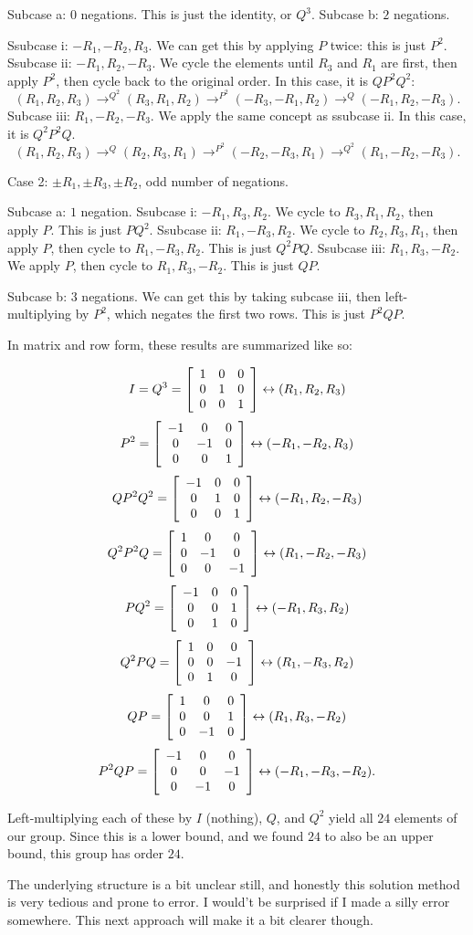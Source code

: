 \documentclass[../key.tex]{subfiles}
\begin{document}
Subcase a: $0$ negations. This is just the identity, or $Q^3$.
Subcase b: $2$ negations.

Ssubcase i: $-R_1, -R_2, R_3$.
We can get this by applying $P$ twice: this is just $P^2$.
Ssubcase ii: $-R_1, R_2, -R_3$.
We cycle the elements until $R_3$ and $R_1$ are first, then apply $P^2$, then cycle back to the original order. In this case, it is $QP^2Q^2$:
$$(R_1,R_2,R_3)\rightarrow^{Q^2} (R_3,R_1,R_2)\rightarrow^{P^2} (-R_3,-R_1,R_2)\rightarrow^{Q} (-R_1,R_2,-R_3).$$
Subcase iii: $R_1, -R_2, -R_3$.
We apply the same concept as ssubcase ii. In this case, it is $Q^2P^2Q$.
$$(R_1,R_2,R_3)\rightarrow^{Q} (R_2,R_3,R_1) \rightarrow^{P^2} (-R_2,-R_3,R_1) \rightarrow^{Q^2} (R_1, -R_2, -R_3).$$

Case 2: $\pm R_1, \pm R_3, \pm R_2$, odd number of negations.

Subcase a: $1$ negation.
Ssubcase i: $-R_1, R_3, R_2$.
We cycle to $R_3, R_1, R_2$, then apply $P$. This is just $PQ^2$.
Ssubcase ii: $R_1, -R_3, R_2$.
We cycle to $R_2, R_3, R_1$, then apply $P$, then cycle to $R_1, -R_3, R_2$. This is just $Q^2PQ$.
Ssubcase iii: $R_1, R_3, -R_2$.
We apply $P$, then cycle to $R_1, R_3, -R_2$. This is just $QP$.

Subcase b: $3$ negations.
We can get this by taking subcase iii, then left-multiplying by $P^2$, which negates the first two rows. This is just $P^2QP$.

In matrix and row form, these results are summarized like so:

$$I = Q^3 = \left[\begin{array}{ccc} 1 & 0 & 0 \\ 0 & 1 & 0 \\ 0 & 0 & 1 \end{array}\right] \leftrightarrow (R_1,R_2,R_3)$$
$$P^2 = \left[\begin{array}{ccc} -1 & 0 & 0 \\ 0 & -1 & 0 \\ 0 & 0 & 1 \end{array}\right] \leftrightarrow (-R_1,-R_2,R_3)$$
$$QP^2Q^2 = \left[\begin{array}{ccc} -1 & 0 & 0 \\ 0 & 1 & 0 \\ 0 & 0 & 1 \end{array}\right] \leftrightarrow (-R_1,R_2,-R_3)$$
$$Q^2P^2Q = \left[\begin{array}{ccc} 1 & 0 & 0 \\ 0 & -1 & 0 \\ 0 & 0 & -1 \end{array}\right] \leftrightarrow (R_1,-R_2,-R_3)$$
$$PQ^2 = \left[\begin{array}{ccc} -1 & 0 & 0 \\ 0 & 0 & 1 \\ 0 & 1 & 0 \end{array}\right] \leftrightarrow (-R_1,R_3,R_2)$$
$$Q^2PQ = \left[\begin{array}{ccc} 1 & 0 & 0 \\ 0 & 0 & -1 \\ 0 & 1 & 0 \end{array}\right] \leftrightarrow (R_1,-R_3,R_2)$$
$$QP = \left[\begin{array}{ccc} 1 & 0 & 0 \\ 0 & 0 & 1 \\ 0 & -1 & 0 \end{array}\right] \leftrightarrow (R_1,R_3,-R_2)$$
$$P^2QP = \left[\begin{array}{ccc} -1 & 0 & 0 \\ 0 & 0 & -1 \\ 0 & -1 & 0 \end{array}\right] \leftrightarrow (-R_1,-R_3,-R_2).$$

Left-multiplying each of these by $I$ (nothing), $Q$, and $Q^2$ yield all $24$ elements of our group. Since this is a lower bound, and we found $24$ to also be an upper bound, this group has order $24$.

The underlying structure is a bit unclear still, and honestly this solution method is very tedious and prone to error. I would't be surprised if I made a silly error somewhere. This next approach will make it a bit clearer though.
\end{document}
